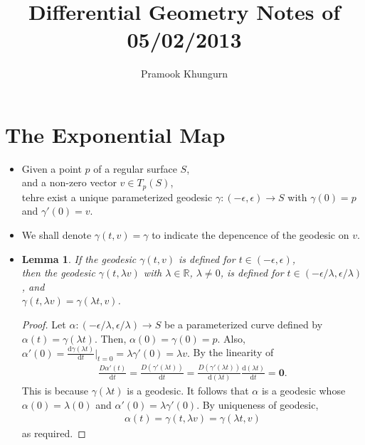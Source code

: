 \documentclass[10pt]{article}
\title{Differential Geometry Notes of 05/02/2013}
\author{Pramook Khungurn}
\newtheorem{lemma}{Lemma}[section]
\newcommand{\dee}{\mathrm{d}}
\newcommand{\ve}[1]{\mathbf{#1}}
\newcommand{\ra}{\rightarrow}
\newcommand{\Real}{\mathbb{R}}
\begin{document}
  \maketitle

  \section{The Exponential Map}
  \begin{itemize}
    \item Given a point $p$ of a regular surface $S$,\\
    and a non-zero vector $v \in T_p(S)$,\\
    tehre exist a unique parameterized geodesic $\gamma: (-\epsilon, \epsilon) \ra S$ with $\gamma(0) = p$ and $\gamma'(0) = v$.

    \item We shall denote $\gamma(t,v) = \gamma$  to indicate the depencence of the geodesic on $v$.

    \item \begin{lemma}
      If the geodesic $\gamma(t,v)$ is defined for $t \in (-\epsilon, \epsilon)$,\\
      then the geodesic $\gamma(t, \lambda v)$ with $\lambda \in \Real$, $\lambda \neq 0$, is defined for $t \in (-\epsilon/\lambda, \epsilon/\lambda)$, and\\
      $\gamma(t,\lambda v) = \gamma(\lambda t, v)$.
    \end{lemma}

    \begin{proof}
      Let $\alpha:(-\epsilon/\lambda, \epsilon/\lambda) \ra S$ be a parameterized curve defined by $\alpha(t) = \gamma(\lambda t).$ Then, $\alpha(0) = \gamma(0) = p.$ Also, $\alpha'(0) = \frac{\dee \gamma(\lambda t)}{\dee t} \big|_{t=0} = \lambda \gamma'(0) = \lambda v.$ By the linearity of 
      \begin{align*}
        \frac{D\alpha'(t)}{\dee t} = \frac{D (\gamma'(\lambda t))}{\dee t} = \frac{D(\gamma'(\lambda t))}{\dee (\lambda t)} \frac{\dee (\lambda t)}{\dee t} = \ve{0}.
      \end{align*}
      This is because $\gamma(\lambda t)$ is a geodesic. It follows that $\alpha$ is a geodesic whose $\alpha(0) = \lambda(0)$ and $\alpha'(0) = \lambda \gamma'(0)$. By uniqueness of geodesic,
      \begin{align*}
        \alpha(t) = \gamma(t, \lambda v) = \gamma(\lambda t, v)
      \end{align*}
      as required.      
    \end{proof}


\end{itemize}
\end{document}
